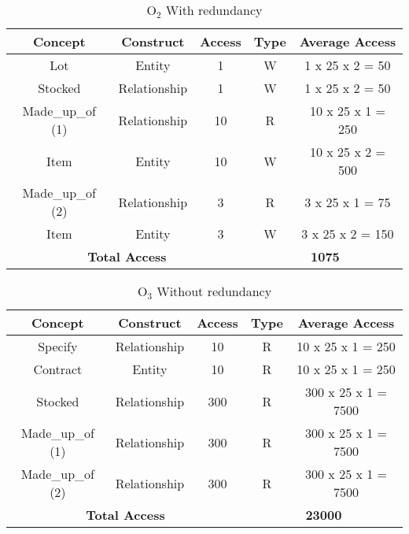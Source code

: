 \begin{table}[!h]\caption{	$ \textrm{O}_\textrm{2} $ With redundancy}
	\begin{center}
		\begin{tabular}{| c | c | c | c | c |}
			\hline
			\textbf{Concept} & \textbf{Construct} & \textbf{Access} & \textbf{Type} & \textbf{Average Access} \\ \hline
			Lot & Entity & 1 & W & 1 x 25 x 2 = 50 \\ \hline
			Stocked & Relationship & 1 & W & 1 x 25 x 2 = 50 \\ \hline
			Made\_up\_of (1) & Relationship & 10 & R & 10 x 25 x 1 = 250 \\ \hline
			Item & Entity & 10 & W & 10 x 25 x 2 = 500 \\ \hline
			Made\_up\_of (2) & Relationship & 3 & R & 3 x 25 x 1 = 75 \\ \hline
			Item & Entity & 3 & W & 3 x 25 x 2 = 150 \\ \hline
			\multicolumn{3}{|c|}{\textbf{Total Access}} & \multicolumn{2}{|c|}{\textbf{1075}} \\ \hline
		\end{tabular}
	\end{center}
\end{table}
\begin{table}[!h]\caption{	$ \textrm{O}_\textrm{3} $ Without redundancy }
	\begin{center}
		\begin{tabular}{| c | c | c | c | c |}
			\hline
			\textbf{Concept} & \textbf{Construct} & \textbf{Access} & \textbf{Type} & \textbf{Average Access} \\ \hline
			Specify & Relationship & 10 & R & 10 x 25 x 1 = 250 \\ \hline
			Contract & Entity & 10 & R & 10 x 25 x 1 = 250 \\ \hline
			Stocked & Relationship & 300 & R & 300 x 25 x 1 = 7500 \\ \hline
            Made\_up\_of (1) & Relationship & 300 & R & 300 x 25 x 1 = 7500 \\ \hline
            Made\_up\_of (2) & Relationship & 300 & R & 300 x 25 x 1 = 7500 \\ \hline
			\multicolumn{3}{|c|}{\textbf{Total Access}} & \multicolumn{2}{|c|}{\textbf{23000}} \\ \hline
		\end{tabular}
	\end{center}
\end{table}

